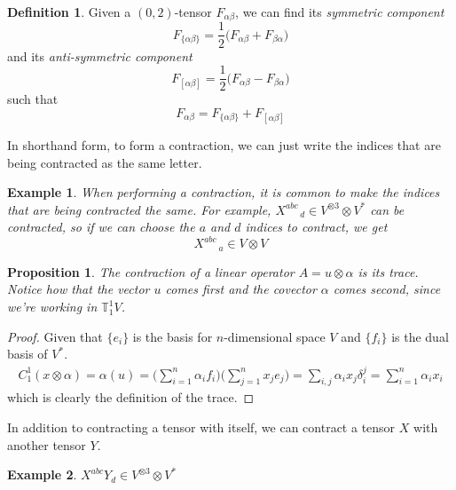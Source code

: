 \documentclass{article}
\newtheorem{proposition}[theorem]{Proposition}
\newtheorem{example}{Example}[section]
\theoremstyle{remark}
\theoremstyle{definition}
\newtheorem{definition}{Definition}[section]
\begin{document}
    \begin{definition}
    Given a $(0, 2)$-tensor $F_{\alpha \beta}$, we can find its \textit{symmetric component}
    \[ F_{ \{ \alpha \beta\}} = \frac{1}{2} \big(F_{\alpha \beta} + F_{\beta \alpha} \big)\]
    and its \textit{anti-symmetric component}
    \[ F_{ [ \alpha \beta]} = \frac{1}{2} \big(F_{\alpha \beta} - F_{\beta \alpha} \big)\]
    such that 
    \[ F_{\alpha \beta} = F_{ \{ \alpha \beta \}} + F_{[\alpha \beta]}\]
    \end{definition}

    In shorthand form, to form a contraction, we can just write the indices that are being contracted as the same letter. 

    \begin{example}
    When performing a contraction, it is common to make the indices that are being contracted the same. For example, $X^{a b c}_{\;\;\;\;\;\; d} \in V^{\otimes 3} \otimes V^*$ can be contracted, so if we can choose the $a$ and $d$ indices to contract, we get 
    \[X^{a b c}_{\;\;\;\;\;\; a} \in V \otimes V\]
    \end{example}

    \begin{proposition}
    The contraction of a linear operator $A = u \otimes \alpha$ is its trace. Notice how that the vector $u$ comes first and the covector $\alpha$ comes second, since we're working in $\mathbb{T}^1_1 V$. 
    \end{proposition}
    \begin{proof}
    Given that $\{e_i\}$ is the basis for $n$-dimensional space $V$ and $\{f_i\}$ is the dual basis of $V^*$.
    \begin{align*}
        C^1_1 (x \otimes \alpha) = \alpha (u) 
        = \Big( \sum_{i=1}^n \alpha_i f_i  \Big) \Big( \sum_{j=1}^n x_j e_j \Big)  = \sum_{i, j} \alpha_i x_j \delta^j_i = \sum_{i=1}^n \alpha_i x_i 
    \end{align*}
    which is clearly the definition of the trace. 
    \end{proof}

    In addition to contracting a tensor with itself, we can contract a tensor $X$ with another tensor $Y$. 

    \begin{example}
    $X^{a b c} Y_d \in V^{\otimes 3} \otimes V^*$ 
    \end{example}
\end{document}
